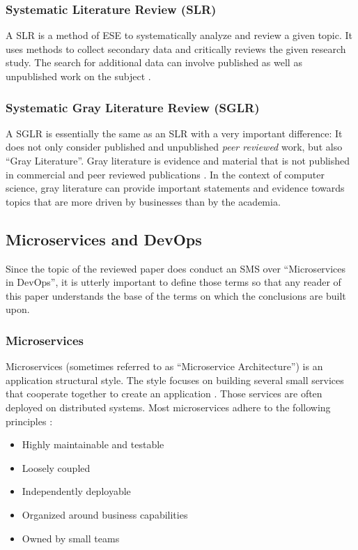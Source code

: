 \subsubsection{Systematic Literature Review (SLR)}

A SLR is a method of ESE to systematically analyze and review a given topic. It uses
methods to collect secondary data and critically reviews the given research study.
The search for additional data can involve published as well as unpublished work
on the subject \cite{siddaway:SLR}.

\subsubsection{Systematic Gray Literature Review (SGLR)}

A SGLR is essentially the same as an SLR with a very important difference:
It does not only consider published and unpublished \textit{peer reviewed} work,
but also ``Gray Literature''. Gray literature is evidence and material that
is not published in commercial and peer reviewed publications \cite{paez:GrayLiterature}.
In the context of computer science, gray literature can provide important statements
and evidence towards topics that are more driven by businesses than by the academia.


\subsection{Microservices and DevOps}

Since the topic of the reviewed paper does conduct an SMS over ``Microservices in DevOps'',
it is utterly important to define those terms so that any reader of this paper
understands the base of the terms on which the conclusions are built upon.

\subsubsection{Microservices}

Microservices (sometimes referred to as ``Microservice Architecture'') is an application
structural style. The style focuses on building several small services that cooperate
together to create an application \cite{richardson:whatIsMSA}. Those services are often deployed on distributed
systems. Most microservices adhere to the following principles \cite{richardson:whatIsMSA}:

\begin{itemize}
    \item Highly maintainable and testable
    \item Loosely coupled
    \item Independently deployable
    \item Organized around business capabilities
    \item Owned by small teams
\end{itemize}

